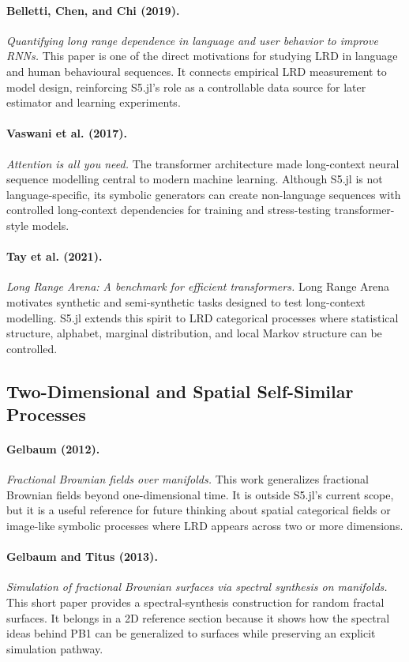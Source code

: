 \documentclass[11pt]{article}
\begin{document}
\paragraph{Belletti, Chen, and Chi (2019).}
\emph{Quantifying long range dependence in language and user behavior to improve
RNNs.}
This paper is one of the direct motivations for studying LRD in language and
human behavioural sequences. It connects empirical LRD measurement to model
design, reinforcing S5.jl's role as a controllable data source for later
estimator and learning experiments.

\paragraph{Vaswani et al. (2017).}
\emph{Attention is all you need.}
The transformer architecture made long-context neural sequence modelling central
to modern machine learning. Although S5.jl is not language-specific, its symbolic
generators can create non-language sequences with controlled long-context
dependencies for training and stress-testing transformer-style models.

\paragraph{Tay et al. (2021).}
\emph{Long Range Arena: A benchmark for efficient transformers.}
Long Range Arena motivates synthetic and semi-synthetic tasks designed to test
long-context modelling. S5.jl extends this spirit to LRD categorical processes
where statistical structure, alphabet, marginal distribution, and local Markov
structure can be controlled.

\subsection{Two-Dimensional and Spatial Self-Similar Processes}

\paragraph{Gelbaum (2012).}
\emph{Fractional Brownian fields over manifolds.}
This work generalizes fractional Brownian fields beyond one-dimensional time.
It is outside S5.jl's current scope, but it is a useful reference for future
thinking about spatial categorical fields or image-like symbolic processes where
LRD appears across two or more dimensions.

\paragraph{Gelbaum and Titus (2013).}
\emph{Simulation of fractional Brownian surfaces via spectral synthesis on
manifolds.}
This short paper provides a spectral-synthesis construction for random fractal
surfaces. It belongs in a 2D reference section because it shows how the spectral
ideas behind PB1 can be generalized to surfaces while preserving an explicit
simulation pathway.
\end{document}
